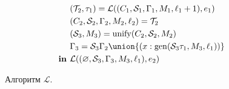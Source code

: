 \begin{figure}[H]
{\begin{minipage}[c][\textheight-2\fboxsep-2\fboxrule-1cm][c]{\dimexpr\textwidth-2\fboxsep-2\fboxrule}
\begin{alignat*}{4}
      & && & &(\mathcal{T}_2, \tau_1) = \mathcal{L}((C_1, \mathcal{S}_1, \Gamma_1, M_1, \ell_1 + 1), e_1)\\
      & && & &(C_2, \mathcal{S}_2, \Gamma_2, M_2, \ell_2) = \mathcal{T}_2\\
      & && & &(\mathcal{S}_3, M_3) = \mathrm{unify}(C_2, \mathcal{S}_2, M_2)\\
      & && & &\Gamma_3 = \mathcal{S}_3\Gamma_2 \union \{(x:\mathrm{gen}(\mathcal{S}_3 \tau_1, M_3, \ell_1))\}\\
      & && &\textbf{in } &\mathcal{L}((\varnothing, \mathcal{S}_3, \Gamma_3, M_3, \ell_1), e_2) \\
    \end{alignat*}
  \end{minipage}}
  \caption{Алгоритм $\mathcal{L}$.}\label{fig:algorithm-L}
\end{figure}
